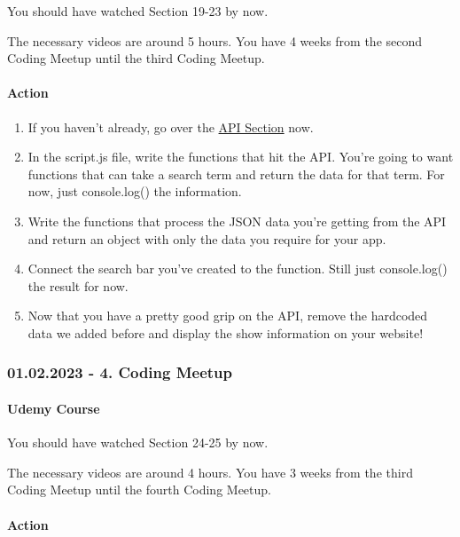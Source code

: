 \documentclass[
]{article}
\providecommand{\tightlist}{%
  \setlength{\itemsep}{0pt}\setlength{\parskip}{0pt}}
\begin{document}
You should have watched Section 19-23 by now.

The necessary videos are around 5 hours. You have 4 weeks from the second Coding Meetup until the third Coding Meetup.

\hypertarget{action-2}{%
\paragraph*{Action}\label{action-2}}

\begin{enumerate}
\def\labelenumi{\arabic{enumi}.}
\tightlist
\item
  If you haven't already, go over the \protect\hyperlink{api}{API Section} now.
\item
  In the script.js file, write the functions that hit the API. You're going to want functions that can take a search term and return the data for that term. For now, just console.log() the information.
\item
  Write the functions that process the JSON data you're getting from the API and return an object with only the data you require for your app.
\item
  Connect the search bar you've created to the function. Still just console.log() the result for now.
\item
  Now that you have a pretty good grip on the API, remove the hardcoded data we added before and display the show information on your website!
\end{enumerate}

\hypertarget{coding-meetup-3}{%
\subsubsection*{01.02.2023 - 4. Coding Meetup}\label{coding-meetup-3}}

\hypertarget{udemy-course-4}{%
\paragraph*{Udemy Course}\label{udemy-course-4}}

You should have watched Section 24-25 by now.

The necessary videos are around 4 hours. You have 3 weeks from the third Coding Meetup until the fourth Coding Meetup.

\hypertarget{action-3}{%
\paragraph*{Action}\label{action-3}}
\end{document}
